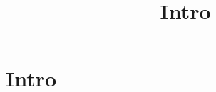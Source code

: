 %
%
%
\title[Intro]{Intro}
\section{Intro}

\begin{frame}
\titlepage
\end{frame}

\subtitle{}



%
%
%
%
%
%
%
%
%
%
%
%
%
%
%
%
%
%
%
%
%
